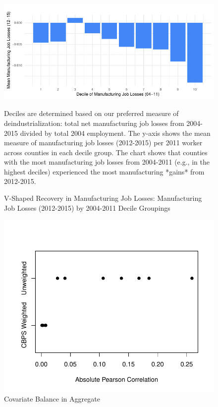 \documentclass[]{AEA}
\begin{document}
\begin{figure} \label{vShapePlot2}
\caption{V-Shaped Recovery in Manufacturing Job Losses: Manufacturing Job Losses (2012-2015) by 2004-2011 Decile Groupings}

\begin{center}\includegraphics{Final-Draft_files/figure-latex/unnamed-chunk-11-1} \end{center}



\FloatBarrier

\begin{figurenotes}
Deciles are determined based on our preferred measure of deindustrialization: total net manufacturing job losses from 2004-2015 divided by total 2004 employment. The y-axis shows the mean measure of manufacturing job losses (2012-2015) per 2011 worker across counties in each decile group. The chart shows that counties with the most manufacturing job losses from 2004-2011 (e.g., in the highest deciles) experienced the most manufacturing *gains* from 2012-2015.
\end{figurenotes}
\end{figure}

\begin{figure} \label{balPlot}
\caption{Covariate Balance in Aggregate}


\begin{center}\includegraphics{Final-Draft_files/figure-latex/unnamed-chunk-12-1} \end{center}



\FloatBarrier

\end{figure}
\end{document}
